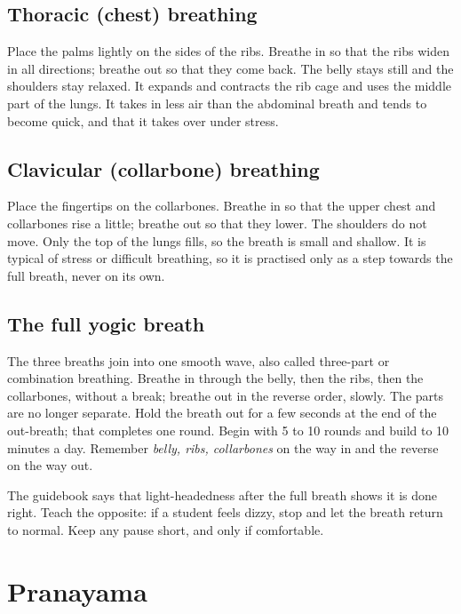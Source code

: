 \subsection*{Thoracic (chest) breathing}
Place the palms lightly on the sides of the ribs. Breathe in so that the ribs widen in all directions; breathe out so that they come back. The belly stays still and the shoulders stay relaxed. It expands and contracts the rib cage and uses the middle part of the lungs. It takes in less air than the abdominal breath and tends to become quick, and that it takes over under stress.

\subsection*{Clavicular (collarbone) breathing}
Place the fingertips on the collarbones. Breathe in so that the upper chest and collarbones rise a little; breathe out so that they lower. The shoulders do not move. Only the top of the lungs fills, so the breath is small and shallow. It is typical of stress or difficult breathing, so it is practised only as a step towards the full breath, never on its own.

\subsection*{The full yogic breath}
The three breaths join into one smooth wave, also called three-part or combination breathing. Breathe in through the belly, then the ribs, then the collarbones, without a break; breathe out in the reverse order, slowly. The parts are no longer separate. Hold the breath out for a few seconds at the end of the out-breath; that completes one round. Begin with 5 to 10 rounds and build to 10 minutes a day. Remember \emph{belly, ribs, collarbones} on the way in and the reverse on the way out.

\begin{caution}
The guidebook says that light-headedness after the full breath shows it is done right. Teach the opposite: if a student feels dizzy, stop and let the breath return to normal. Keep any pause short, and only if comfortable.
\end{caution}

\section{Pranayama}

